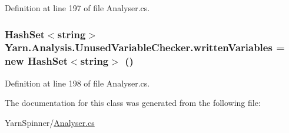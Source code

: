 Definition at line 197 of file Analyser.\-cs.

\hypertarget{a00185_a0c2fe6eded1b10b135ca2469f5980a39}{
\subsubsection[{written\-Variables}]{\setlength{\rightskip}{0pt plus 5cm}Hash\-Set$<$string$>$ Yarn.\-Analysis.\-Unused\-Variable\-Checker.\-written\-Variables = new Hash\-Set$<$string$>$ ()\hspace{0.3cm}{\ttfamily [private]}}}\label{a00185_a0c2fe6eded1b10b135ca2469f5980a39}


Definition at line 198 of file Analyser.\-cs.



The documentation for this class was generated from the following file\-:\begin{DoxyCompactItemize}
\item 
Yarn\-Spinner/\hyperlink{a00302}{Analyser.\-cs}\end{DoxyCompactItemize}

